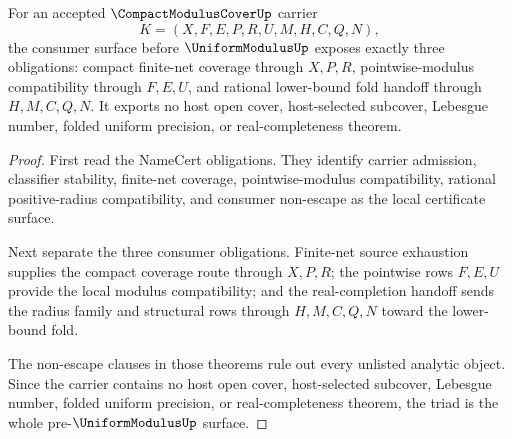\begin{theorem}
\label{thm:compact-modulus-cover-obligation-triad}
For an accepted $\CompactModulusCoverUp$ carrier
$$
K=(X,F,E,P,R,U,M,H,C,Q,N),
$$
the consumer surface before $\UniformModulusUp$ exposes exactly three obligations: compact finite-net coverage through $X,P,R$, pointwise-modulus compatibility through $F,E,U$, and rational lower-bound fold handoff through $H,M,C,Q,N$. It exports no host open cover, host-selected subcover, Lebesgue number, folded uniform precision, or real-completeness theorem.
\end{theorem}
\begin{proof}
First read the NameCert obligations. They identify carrier admission, classifier stability, finite-net coverage, pointwise-modulus compatibility, rational positive-radius compatibility, and consumer non-escape as the local certificate surface.

Next separate the three consumer obligations. Finite-net source exhaustion supplies the compact coverage route through $X,P,R$; the pointwise rows $F,E,U$ provide the local modulus compatibility; and the real-completion handoff sends the radius family and structural rows through $H,M,C,Q,N$ toward the lower-bound fold.

The non-escape clauses in those theorems rule out every unlisted analytic object. Since the carrier contains no host open cover, host-selected subcover, Lebesgue number, folded uniform precision, or real-completeness theorem, the triad is the whole pre-$\UniformModulusUp$ surface.
\end{proof}

